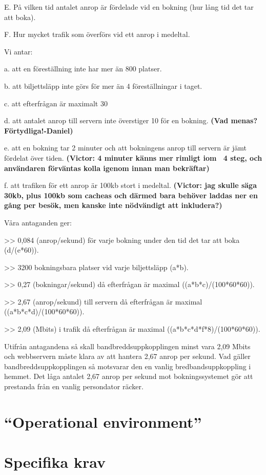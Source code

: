 \documentclass[a4paper, twoside, 11pt, titlepage]{article}
\begin{document}
E.	På vilken tid antalet anrop är fördelade vid en bokning (hur lång tid det tar att boka).

F.	Hur mycket trafik som överförs vid ett anrop i medeltal.

Vi antar: 

a.	att en föreställning inte har mer än 800 platser.

b.	att biljettsläpp inte görs för mer än 4 föreställningar i taget.

c.	att efterfrågan är maximalt 30%

d.	att antalet anrop till servern inte överstiger 10 för en bokning. \textbf{(Vad menas? Förtydliga!-Daniel)} 

e.	att en bokning tar 2 minuter och att bokningens anrop till servern är jämt fördelat över tiden. \textbf{(Victor: 4 minuter känns mer rimligt iom ~4 steg, och användaren förväntas kolla igenom innan man bekräftar)} 

f.	att trafiken för ett anrop är 100kb stort i medeltal. \textbf{(Victor: jag skulle säga 30kb, plus 100kb som cacheas och därmed bara behöver laddas ner en gång per besök, men kanske inte nödvändigt att inkludera?)} 

Våra antaganden ger:

>> 0,084 (anrop/sekund) för varje bokning under den tid det tar att boka (d/(e*60)).

>> 3200 bokningsbara platser vid varje biljettsläpp (a*b).

>> 0,27 (bokningar/sekund) då efterfrågan är maximal ((a*b*c)/(100*60*60)).

>> 2,67 (anrop/sekund) till servern då efterfrågan är maximal ((a*b*c*d)/(100*60*60)).

>> 2,09 (Mbits) i trafik då efterfrågan är maximal ((a*b*c*d*f*8)/(100*60*60)).

Utifrån antagandena så skall bandbreddsuppkopplingen minst vara 2,09 Mbits och webbservern måste klara av att hantera 2,67 anrop per sekund. Vad gäller bandbreddsuppkopplingen så motsvarar den en vanlig bredbandsuppkoppling i hemmet. Det låga antalet 2,67 anrop per sekund mot bokningssystemet gör att prestanda från en vanlig persondator räcker.

\section{``Operational environment''}


\section{Specifika krav}
\end{document}
